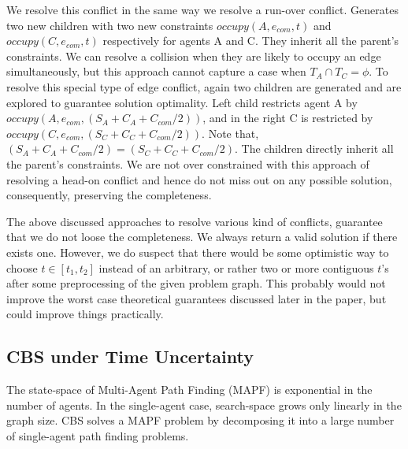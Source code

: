 \documentclass{article}
\begin{document}
{We resolve this conflict in the same way we resolve a run-over conflict. Generates two new children with two new constraints $occupy(A,e_{com},t)$ and $occupy(C,e_{com},t)$ respectively for agents A and C. They inherit all the parent's constraints. 
%
%
We can resolve a collision when they are likely to occupy an edge simultaneously, but this approach cannot capture a case when $T_A \cap T_C = \phi$. 
To resolve this special type of edge conflict, again two children are generated and are explored to guarantee solution optimality.
Left child restricts agent A by $occupy(A,e_{com},(S_A+C_A + C_{com}/2))$, and in the right C is restricted by $occupy(C,e_{com},(S_C+C_C + C_{com}/2))$. Note that, $(S_A+C_A + C_{com}/2) = (S_C+C_C + C_{com}/2)$. The children directly inherit all the parent's constraints. 
%
We are not over constrained with this approach of resolving a head-on conflict and hence do not miss out on any possible solution, consequently, preserving the completeness.

The above discussed approaches to resolve various kind of conflicts, guarantee that we do not loose the completeness. 
We always return a valid solution if there exists one. 
However, we do suspect that there would be some optimistic way to choose $t \in [t_1,t_2]$ instead of an arbitrary, or rather two or more contiguous $t$'s after some preprocessing of the given problem graph. 
This probably would not improve the worst case theoretical guarantees discussed later in the paper, but could improve things practically.  

\subsection{CBS under Time Uncertainty}
\label{cbstu}
The state-space of Multi-Agent Path Finding (MAPF) is exponential in the number of agents.
In the single-agent case, search-space grows only linearly in the graph size.
CBS solves a MAPF problem by decomposing it into a large number of single-agent path finding problems.

}
\end{document}

